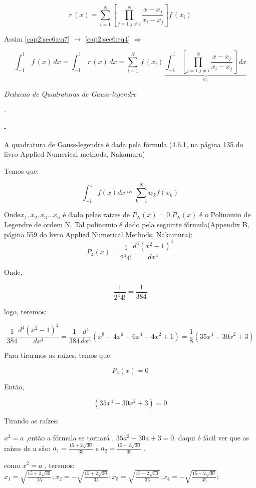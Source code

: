 \begin{enumerate}
\begin{equation}
 \label{cap2:sec6:eq7}
 r\,(x) =
 \sum_{i=1}^N \left[
  \prod_{
    j=1 \,\, j \neq i
  }^N
  \frac{x-x_j}{x_i-x_j}
 \right]
 f\,(x_i)
\end{equation}

Assim \ref{cap2:sec6:eq7} $\rightarrow$ \ref{cap2:sec6:eq4} $\Rightarrow$

\[
 \int_{-1}^1 \, f\,(x) \, dx = \int_{-1}^1 \, r\,(x) \, dx = \sum_{i=1}^N \, f\,(x_i) \,
 \underbrace{
 \int_{-1}^1 \left[
  \prod_{
    j=1 \,\, j \neq i
  }^N
  \frac{x-x_j}{x_i-x_j}
 \right]
 \, dx
 }_{
  w_i
 }
\]
\begin{example}
 \emph{ Deducao de Quadraturas de Gauss-legendre } 

-

-

A quadratura de Gauss-legendre é dada pela fórmula (4.6.1, na página
135 do livro Applied Numerical methods, Nakamura)

Temos que:

\emph{\[
\int_{-1}^{1}{\scriptstyle f(x)dx}\backsimeq\sum_{{\scriptstyle {\scriptscriptstyle k=1}}}^{{\scriptscriptstyle N}}{\scriptstyle w_{k}f(x_{k})}\]
}

Onde$x_{1},x_{2},x_{3}...x_{n}$ é dado pelas raizes de $P_{N}(x)=0$,$P_{N}(x)$
é o Polinomio de Legendre de ordem N. Tal polinomio é dado pela seguinte
fórmula(Appendix B, página 559 do livro Applied Numerical Methods,
Nakamura): \[
P_{4}(x)=\frac{1}{2^{4}4!}\frac{d^{4}(x^{2}-1)^{4}}{dx^{4}}\]


Onde, 

\[
\frac{1}{2^{4}4!}=\frac{1}{384}\]


logo, teremos:

\[
\frac{1}{384}\frac{d^{4}(x^{2}-1)^{4}}{dx^{4}}=\frac{1}{384}\frac{d^{4}}{dx^{4}}(x^{8}-4x^{6}+6x^{4}-4x^{2}+1)=\frac{1}{8}(35x^{4}-30x^{2}+3)\]


Para tirarmos as raízes, temos que:

\[
P_{4}(x)=0\]


Então,

\[
(35x^{4}-30x^{2}+3)=0\]


Tirando as raízes:


$x^{2}=a$ ,então a fórmula se tornará , $35a^{2}-30a+3=0$, daqui
é fácil ver que as raízes de a são: $a_{1}=\frac{15+2\sqrt{30}}{35}$
e $a_{2}=\frac{15-2\sqrt{30}}{35}$ .

como $x^{2}=a$ , teremos: $x_{1}=\sqrt{\frac{15+2\sqrt{30}}{35}};x_{2}=-\sqrt{\frac{15+2\sqrt{30}}{35}};x_{3}=\sqrt{\frac{15-2\sqrt{30}}{35}};x_{4}=-\sqrt{\frac{15-2\sqrt{30}}{35}};$


\end{example}
\end{enumerate}
